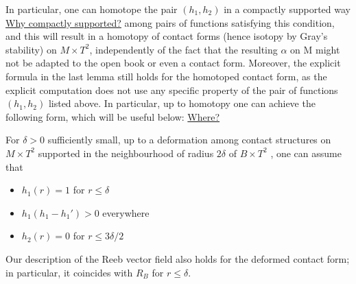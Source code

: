 In particular, one can homotope the pair $(h_1 , h_2)$ in a compactly supported way \underline{Why compactly supported?} among pairs of functions satisfying this condition, 
and this will result in a homotopy of contact forms (hence isotopy by Gray's stability) on $M \times T^2$, 
independently of the fact that the resulting $\alpha$ on M might not be adapted to the open book or even a contact form. 
Moreover, the explicit formula in the last lemma still holds for the homotoped contact form, as the explicit computation does not use any specific property of the pair of functions $(h_1, h_2)$ listed above.
In particular, up to homotopy one can achieve the following form, which
will be useful below: \underline{Where?}
\begin{lemma}
    For $\delta > 0$ sufficiently small, up to a deformation among contact structures on $M\times T^2$ supported in the neighbourhood of radius $2\delta$ of $B \times T^2$ , one can assume that
    \begin{itemize}
        \item $h_1(r) = 1$ for $r \le \delta$
        \item $h_1(h_1 - h_1') > 0$ everywhere
        \item $h_2(r) = 0$ for $r \le 3\delta/2$ 
    \end{itemize}
    Our description of the Reeb vector field also holds for the deformed contact form; in particular, it coincides with $R_B$ for $r\le \delta$.
\end{lemma}